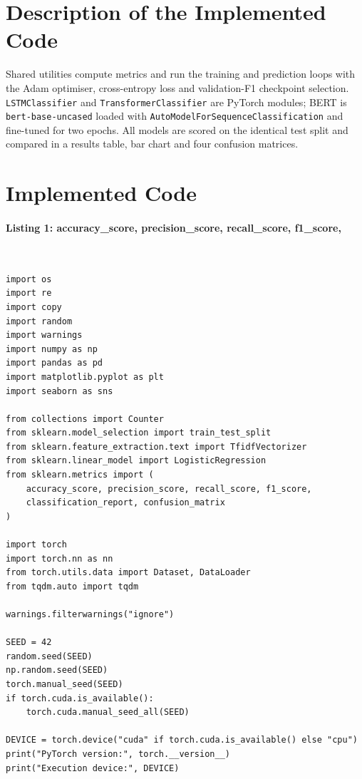 \documentclass[12pt,a4paper,oneside]{report}
\begin{document}
\section{Description of the Implemented Code}
Shared utilities compute metrics and run the training and prediction loops with the Adam optimiser, cross-entropy loss and validation-F1 checkpoint selection. \texttt{LSTMClassifier} and \texttt{TransformerClassifier} are PyTorch modules; BERT is \texttt{bert-base-uncased} loaded with \texttt{AutoModelForSequenceClassification} and fine-tuned for two epochs. All models are scored on the identical test split and compared in a results table, bar chart and four confusion matrices.


\section{Implemented Code}
\paragraph{Listing 1: accuracy\_score, precision\_score, recall\_score, f1\_score,}\mbox{}\\[-1ex]
\begin{Verbatim}[commandchars=\\\{\},breaklines=true,breakanywhere=true,fontsize=\scriptsize,frame=leftline,framesep=2mm,rulecolor=\color{gray}]
import os
import re
import copy
import random
import warnings
import numpy as np
import pandas as pd
import matplotlib.pyplot as plt
import seaborn as sns

from collections import Counter
from sklearn.model_selection import train_test_split
from sklearn.feature_extraction.text import TfidfVectorizer
from sklearn.linear_model import LogisticRegression
from sklearn.metrics import (
    accuracy_score, precision_score, recall_score, f1_score,
    classification_report, confusion_matrix
)

import torch
import torch.nn as nn
from torch.utils.data import Dataset, DataLoader
from tqdm.auto import tqdm

warnings.filterwarnings("ignore")

SEED = 42
random.seed(SEED)
np.random.seed(SEED)
torch.manual_seed(SEED)
if torch.cuda.is_available():
    torch.cuda.manual_seed_all(SEED)

DEVICE = torch.device("cuda" if torch.cuda.is_available() else "cpu")
print("PyTorch version:", torch.__version__)
print("Execution device:", DEVICE)
\end{Verbatim}
\end{document}
